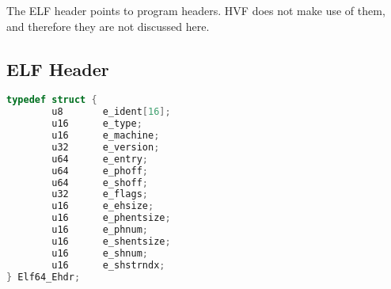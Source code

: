 The ELF header points to program headers.  HVF does not make use of them,
and therefore they are not discussed here.
\cbend

\cbstart
\subsection{ELF Header}
\cbend

\cbdelete
\begin{lstlisting}[language=C]
typedef struct {
        u8       e_ident[16];
        u16      e_type;
        u16      e_machine;
        u32      e_version;
        u64      e_entry;
        u64      e_phoff;
        u64      e_shoff;
        u32      e_flags;
        u16      e_ehsize;
        u16      e_phentsize;
        u16      e_phnum;
        u16      e_shentsize;
        u16      e_shnum;
        u16      e_shstrndx;
} Elf64_Ehdr;
\end{lstlisting}

